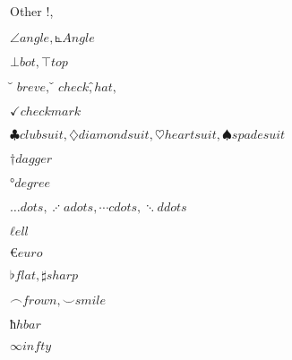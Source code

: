 \documentclass{article}
\begin{document}
Other !, %

$∠ angle, ⦜ Angle$

$⊥ bot, ⊤ top$

$̆ breve, ̌ check, ̂ hat,$ %

$✓ checkmark$

$♣ clubsuit, ♢ diamondsuit, ♡ heartsuit, ♠ spadesuit$

$† dagger$

$° degree$

$… dots, ⋰ adots, ⋯ cdots, ⋱ ddots$

$ℓ ell$

$€ euro$

$♭ flat, ♯ sharp$

$⌢ frown, ⌣ smile$

$ħ hbar$

$∞ infty$
\end{document}
